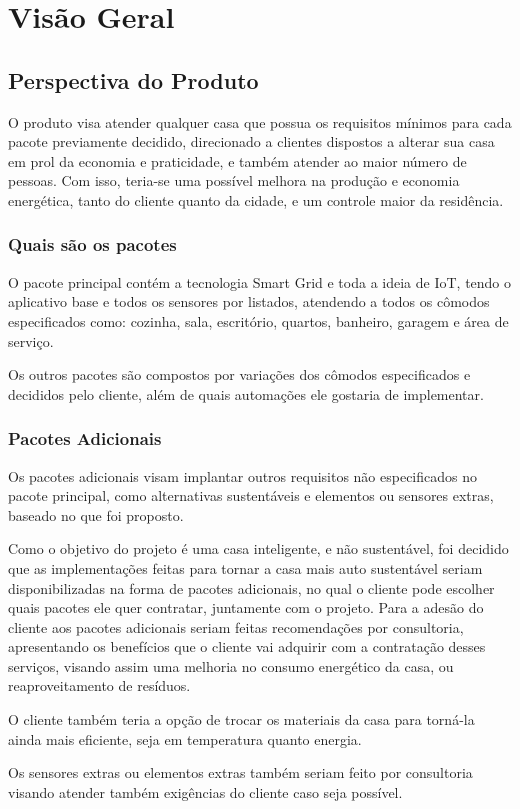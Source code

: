 \chapter{Visão Geral}
    \section{Perspectiva do Produto}
        \par O produto visa atender qualquer casa que possua os requisitos mínimos para cada pacote previamente decidido, direcionado a clientes dispostos a alterar sua casa em prol da economia e praticidade, e também atender ao maior número de pessoas. Com isso, teria-se uma  possível melhora na produção e economia energética, tanto do cliente quanto da cidade, e um controle maior da residência.

        \subsection{Quais são os pacotes}
            \par O pacote principal contém a tecnologia Smart Grid e toda a ideia de IoT, tendo o aplicativo base e todos os sensores por listados, atendendo a todos os cômodos especificados como: cozinha, sala, escritório, quartos, banheiro, garagem e área de serviço.
	        \par Os outros pacotes são compostos por variações dos cômodos especificados e decididos pelo cliente, além de quais automações ele gostaria de implementar.

        \subsection{Pacotes Adicionais}
            \par Os pacotes adicionais visam implantar outros requisitos não especificados no pacote principal, como alternativas sustentáveis e elementos ou sensores extras, baseado no que foi proposto.
	        \par Como o objetivo do projeto é uma casa inteligente, e não sustentável, foi decidido que as implementações feitas para tornar a casa mais auto sustentável seriam disponibilizadas na forma de pacotes adicionais, no qual o cliente pode escolher quais pacotes ele quer contratar, juntamente com o projeto. Para a adesão do cliente aos pacotes adicionais seriam feitas recomendações por consultoria, apresentando os benefícios que o cliente vai adquirir com a contratação desses serviços, visando assim uma melhoria no consumo energético da casa, ou reaproveitamento de resíduos.
            \par O cliente também teria a opção de trocar os materiais da casa para torná-la ainda mais eficiente, seja em temperatura quanto energia.
            \par Os sensores extras ou elementos extras também seriam feito por consultoria visando atender também exigências do cliente caso seja possível.

